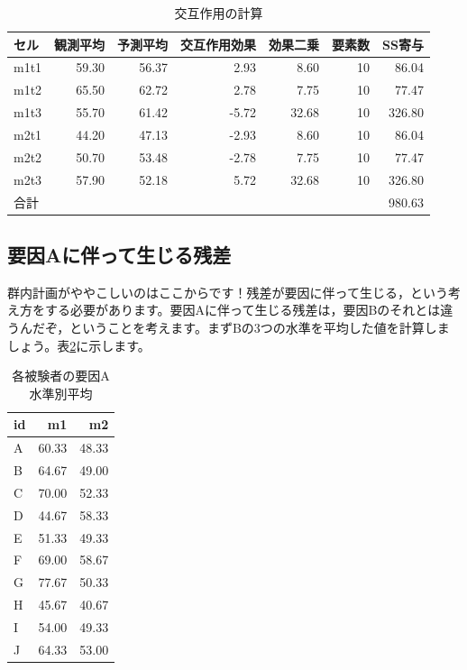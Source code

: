 \documentclass{ltjbook}
\begin{document}
\begin{table}[ht]
\centering
	\caption{交互作用の計算}
	\label{tbl:21_08}
\begin{tabular}{lrrrrrr}
  \hline
セル & 観測平均 & 予測平均 & 交互作用効果 & 効果二乗 & 要素数 & SS寄与 \\
  \hline
m1t1 & 59.30 & 56.37 & 2.93 & 8.60 & 10 & 86.04 \\
  m1t2 & 65.50 & 62.72 & 2.78 & 7.75 & 10 & 77.47 \\
  m1t3 & 55.70 & 61.42 & -5.72 & 32.68 & 10 & 326.80 \\
  m2t1 & 44.20 & 47.13 & -2.93 & 8.60 & 10 & 86.04 \\
  m2t2 & 50.70 & 53.48 & -2.78 & 7.75 & 10 & 77.47 \\
  m2t3 & 57.90 & 52.18 & 5.72 & 32.68 & 10 & 326.80 \\
  \hline
  合計 &  &  &  &  &  & 980.63 \\
   \hline
\end{tabular}
\end{table}

\subsection{要因Aに伴って生じる残差}
群内計画がややこしいのはここからです！残差が要因に伴って生じる，という考え方をする必要があります。要因Aに伴って生じる残差は，要因Bのそれとは違うんだぞ，ということを考えます。まずBの3つの水準を平均した値を計算しましょう。表\ref{tbl:21_09}に示します。

\begin{table}[ht]
\centering
	\caption{各被験者の要因A水準別平均}
	\label{tbl:21_09}
\begin{tabular}{lrr}
  \hline
id & m1 & m2 \\
  \hline
A & 60.33 & 48.33 \\
  B & 64.67 & 49.00 \\
  C & 70.00 & 52.33 \\
  D & 44.67 & 58.33 \\
  E & 51.33 & 49.33 \\
  F & 69.00 & 58.67 \\
  G & 77.67 & 50.33 \\
  H & 45.67 & 40.67 \\
  I & 54.00 & 49.33 \\
  J & 64.33 & 53.00 \\
   \hline
\end{tabular}
\end{table}
\end{document}
